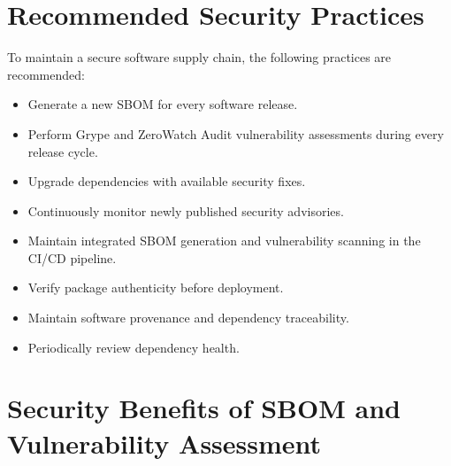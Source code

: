 \vspace{0.4cm}


\section{Recommended Security Practices}

To maintain a secure software supply chain, the following practices are recommended:
\begin{itemize}
\item Generate a new SBOM for every software release.
\item Perform Grype and ZeroWatch Audit vulnerability assessments during every release cycle.
\item Upgrade dependencies with available security fixes.
\item Continuously monitor newly published security advisories.
\item Maintain integrated SBOM generation and vulnerability scanning in the CI/CD pipeline.
\item Verify package authenticity before deployment.
\item Maintain software provenance and dependency traceability.
\item Periodically review dependency health.
\end{itemize}

\vspace{0.4cm}


\section{Security Benefits of SBOM and Vulnerability Assessment}

